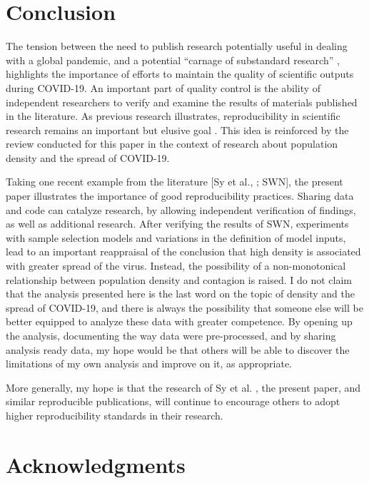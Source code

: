 \documentclass[preprint, 3p,
authoryear]{elsarticle} %
\begin{document}
\hypertarget{conclusion}{%
\section{Conclusion}\label{conclusion}}

The tension between the need to publish research potentially useful in
dealing with a global pandemic, and a potential ``carnage of substandard
research'' \citep{Bramstedt2020carnage}, highlights the importance of
efforts to maintain the quality of scientific outputs during COVID-19.
An important part of quality control is the ability of independent
researchers to verify and examine the results of materials published in
the literature. As previous research illustrates, reproducibility in
scientific research remains an important but elusive goal
\citep[e.g.,][]{Iqbal2016reproducible, Stodden2018empirical, Sumner2020reproducibility, Gustot2020quality}.
This idea is reinforced by the review conducted for this paper in the
context of research about population density and the spread of COVID-19.

Taking one recent example from the literature {[}Sy et al.,
\citet{Sy2021population}; SWN{]}, the present paper illustrates the
importance of good reproducibility practices. Sharing data and code can
catalyze research, by allowing independent verification of findings, as
well as additional research. After verifying the results of SWN,
experiments with sample selection models and variations in the
definition of model inputs, lead to an important reappraisal of the
conclusion that high density is associated with greater spread of the
virus. Instead, the possibility of a non-monotonical relationship
between population density and contagion is raised. I do not claim that
the analysis presented here is the last word on the topic of density and
the spread of COVID-19, and there is always the possibility that someone
else will be better equipped to analyze these data with greater
competence. By opening up the analysis, documenting the way data were
pre-processed, and by sharing analysis ready data, my hope would be that
others will be able to discover the limitations of my own analysis and
improve on it, as appropriate.

More generally, my hope is that the research of Sy et al.
\citeyearpar{Sy2021population}, the present paper, and similar
reproducible publications, will continue to encourage others to adopt
higher reproducibility standards in their research.

\hypertarget{acknwledgments}{%
\section*{Acknowledgments}\label{acknwledgments}}
\end{document}
